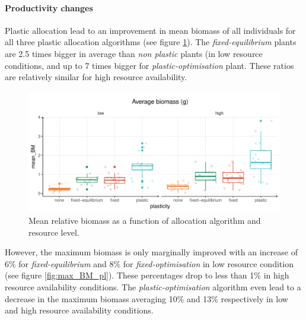 \paragraph{Productivity changes}

Plastic allocation lead to an improvement in mean biomass of all individuals for all three plastic allocation algorithms (see figure \ref{fig:mean_BM_pl}). The \textit{fixed-equilibrium} plants are 2.5 times bigger in average than \textit{non plastic} plants (in low resource conditions, and up to 7 times bigger for \textit{plastic-optimisation} plant. These ratios are relatively similar for high resource availability. 

\begin{figure}\label{fig:mean_BM_pl}
\includegraphics[width = \textwidth]{./2_PP/Figures/Landscape/plot_BM_allocation.pdf}
\caption{Mean relative biomass as a function of allocation algorithm and resource level.}
\end{figure}

However, the maximum biomass is only marginally improved with an increase of 6\% for \textit{fixed-equilibrium} and 8\% for \textit{fixed-optimisation} in low resource condition (see figure \ref{fig:max_BM_pl}). These percentages drop to less than 1\% in high resource availability conditions. The \textit{plastic-optimisation} algorithm even lead to a decrease in the maximum biomass averaging 10\% and 13\% respectively in low and high resource availability conditions.

